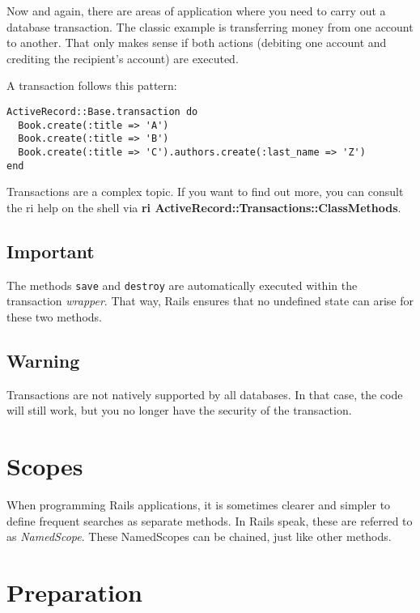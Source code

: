 \documentclass[a4paper]{book}
\newcounter{tab}[chapter]
\begin{document}
Now and again, there are areas of application where you need to carry out a database transaction. The classic example is transferring money from one account to another. That only makes sense if both actions (debiting one account and crediting the recipient's account) are executed.

A transaction follows this pattern:

\begin{shaded}\begin{verbatim}
ActiveRecord::Base.transaction do
  Book.create(:title => 'A')
  Book.create(:title => 'B')
  Book.create(:title => 'C').authors.create(:last_name => 'Z')
end
\end{verbatim}\end{shaded}

Transactions are a complex topic. If you want to find out more, you can consult the ri help on the shell via \textbf{ri ActiveRecord::Transactions::ClassMethods}.

\subsection{Important}\label{important-9}

The methods \texttt{save} and \texttt{destroy} are automatically executed within the transaction \emph{wrapper}. That way, Rails ensures that no undefined state can arise for these two methods.

\subsection{Warning}\label{warning-5}

Transactions are not natively supported by all databases. In that case, the code will still work, but you no longer have the security of the transaction.

\section{Scopes}\label{scopes}

When programming Rails applications, it is sometimes clearer and simpler to define frequent searches as separate methods. In Rails speak, these are referred to as \emph{NamedScope}. These NamedScopes can be chained, just like other methods.

\section{Preparation}\label{preparation-2}
\end{document}
